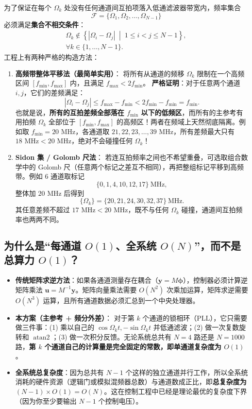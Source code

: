 \documentclass[UTF8, a4paper, 11pt]{ctexart}
\begin{document}
为了保证在每个 $\Omega_k$ 处没有任何通道间互拍项落入低通滤波器带宽内，频率集合
\[
    \mathcal{F} = \{\Omega_1, \Omega_2, \dots, \Omega_{N-1}\}
\]
必须满足\textbf{集合不相交条件}：
\[
    \boxed{
    \begin{gathered}
        \Omega_k \notin \left\{ |\Omega_i - \Omega_j| \;\middle|\; 1 \le i < j \le N-1 \right\}, \\
        \forall k \in \{1, \dots, N-1\}.
    \end{gathered}
    }
\]
工程上有两种严格的构造方法：
\begin{enumerate}
    \item \textbf{高频带整体平移法（最简单实用）}：
    将所有从通道的频移 $\Omega_k$ 限制在一个高频区间 $[f_{\min}, f_{\max}]$ 内，且满足 $f_{\max} < 2 f_{\min}$。
    \textbf{严格证明}：对于任意两个通道 $i, j$，它们的差频满足：
    \[
        |\Omega_i - \Omega_j| \le f_{\max} - f_{\min} < 2f_{\min} - f_{\min} = f_{\min}.
    \]
    也就是说，\textbf{所有的互拍差频全部落在 $f_{\min}$ 以下的低频区}，而所有的主参考有用拍频 $\Omega_k$ 全部位于 $[f_{\min}, f_{\max}]$ 的高频区！两者在频域上天然彻底隔离。例如取 $f_{\min} = 20\text{ MHz}$，各通道取 $21, 22, 23, \dots, 39\text{ MHz}$，所有差频最大只有 $18\text{ MHz} < 20\text{ MHz}$，绝对不会碰撞任何 $\Omega_k$！
    \item \textbf{Sidon 集 / Golomb 尺法}：
    若连互拍频率之间也不希望重叠，可选取组合数学中的 Golomb 尺（任意两个标记之差互不相同），再把整组标记平移到高频带。例如 6 通道取标记
    \[
        \{0, 1, 4, 10, 12, 17\}\ \text{MHz},
    \]
    整体加 $20\text{ MHz}$ 后得到
    \[
        \{\Omega_k\} = \{20, 21, 24, 30, 32, 37\}\ \text{MHz}.
    \]
    其任意差频不超过 $17\text{ MHz} < 20\text{ MHz}$，既不与任何 $\Omega_k$ 碰撞，通道间互拍频率也两两不同。
\end{enumerate}

\subsection{为什么是“每通道 \texorpdfstring{$O(1)$}{O(1)}、全系统 \texorpdfstring{$O(N)$}{O(N)}”，而不是总算力 \texorpdfstring{$O(1)$}{O(1)}？}

\begin{itemize}
    \item \textbf{传统矩阵求逆方法}：如果各通道测量存在耦合（$\bm{y} = M \bm{\phi}$），控制器必须计算逆矩阵乘法 $\bm{u} = M^{-1}\bm{y}$。矩阵向量乘法需要 $O(N^2)$ 次乘加运算，矩阵求逆需要 $O(N^3)$ 运算，且所有通道数据必须汇总到一个中央处理器。
    \item \textbf{本方案（主参考 + 频分外差）}：
    对于第 $k$ 个通道的锁相环（PLL），它只需要做三件事：(1) 乘以自己的 $\cos\Omega_k t, -\sin\Omega_k t$ 并低通滤波；(2) 做一次复数旋转和 $\operatorname{atan2}$；(3) 做一次积分反馈。无论系统总共有 $N=4$ 路还是 $N=1000$ 路，\textbf{第 $k$ 个通道自己的计算量是完全固定的常数，即单通道复杂度为 $O(1)$}。
    \item \textbf{全系统总复杂度}：因为总共有 $N-1$ 个这样的独立通道并行工作，所以全系统消耗的硬件资源（逻辑门或模拟混频器总数）与通道数成正比，即\textbf{总复杂度为 $(N-1) \times O(1) = O(N)$}。这在控制工程中已经是理论最优的复杂度下界（因为你至少要输出 $N-1$ 个控制电压）。
\end{itemize}
\end{document}
